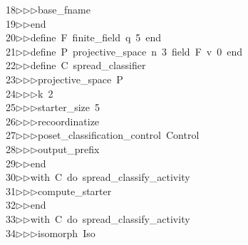 \begin{tabbing}
18\>$\triangleright$\>$\triangleright$\>$\triangleright$\>base\_fname\ \ \\[0pt]
19\>$\triangleright$\>$\triangleright$\>end\ \\[0pt]
20\>$\triangleright$\>$\triangleright$\>define\ F\ finite\_field\ q\ 5\ end\ \\[0pt]
21\>$\triangleright$\>$\triangleright$\>define\ P\ projective\_space\ n\ 3\ field\ F\ v\ 0\ end\ \\[0pt]
22\>$\triangleright$\>$\triangleright$\>define\ C\ spread\_classifier\ \\[0pt]
23\>$\triangleright$\>$\triangleright$\>$\triangleright$\>projective\_space\ P\ \\[0pt]
24\>$\triangleright$\>$\triangleright$\>$\triangleright$\>k\ 2\ \\[0pt]
25\>$\triangleright$\>$\triangleright$\>$\triangleright$\>starter\_size\ 5\ \\[0pt]
26\>$\triangleright$\>$\triangleright$\>$\triangleright$\>recoordinatize\ \\[0pt]
27\>$\triangleright$\>$\triangleright$\>$\triangleright$\>poset\_classification\_control\ Control\ \\[0pt]
28\>$\triangleright$\>$\triangleright$\>$\triangleright$\>output\_prefix\ \ \\[0pt]
29\>$\triangleright$\>$\triangleright$\>end\ \\[0pt]
30\>$\triangleright$\>$\triangleright$\>with\ C\ do\ spread\_classify\_activity\ \\[0pt]
31\>$\triangleright$\>$\triangleright$\>$\triangleright$\>compute\_starter\ \\[0pt]
32\>$\triangleright$\>$\triangleright$\>end\ \\[0pt]
33\>$\triangleright$\>$\triangleright$\>with\ C\ do\ spread\_classify\_activity\ \\[0pt]
34\>$\triangleright$\>$\triangleright$\>$\triangleright$\>isomorph\ Iso\ \\[0pt]

\end{tabbing}

